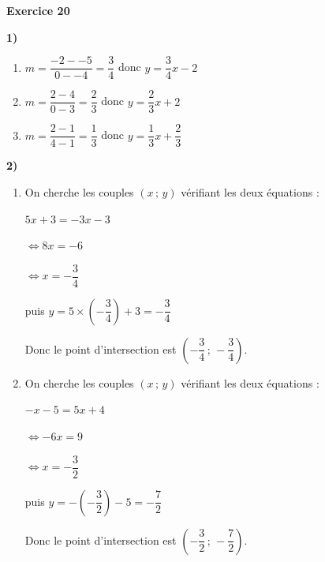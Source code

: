 \documentclass[12pt,a4paper,french]{article}
\begin{document}
\noindent\textbf{Exercice 20}\par
\smallskip
\textbf{1)}
\begin{enumerate}
\item $m = \dfrac{-2--5}{0--4} = \dfrac{3}{4}$ donc $y = \dfrac{3}{4}x - 2$
\item $m = \dfrac{2-4}{0-3} = \dfrac{2}{3}$ donc $y = \dfrac{2}{3}x + 2$
\item $m = \dfrac{2-1}{4-1} = \dfrac{1}{3}$ donc $y = \dfrac{1}{3}x + \dfrac{2}{3}$
\end{enumerate}
\textbf{2)}
\begin{enumerate}
\item On cherche les couples $(x\,;\,y)$ vérifiant les deux équations :

$5x + 3 = -3x - 3$

$\Leftrightarrow 8x = -6$

$\Leftrightarrow x = - \dfrac{3}{4}$

puis $y = 5 \times (- \dfrac{3}{4}) + 3 = - \dfrac{3}{4}$

Donc le point d'intersection est $\left(- \dfrac{3}{4}\,;\,- \dfrac{3}{4}\right)$.
\item On cherche les couples $(x\,;\,y)$ vérifiant les deux équations :

$-x - 5 = 5x + 4$

$\Leftrightarrow -6x = 9$

$\Leftrightarrow x = - \dfrac{3}{2}$

puis $y = -(- \dfrac{3}{2}) - 5 = - \dfrac{7}{2}$

Donc le point d'intersection est $\left(- \dfrac{3}{2}\,;\,- \dfrac{7}{2}\right)$.
\end{enumerate}
\medskip

\newpage
\end{document}
